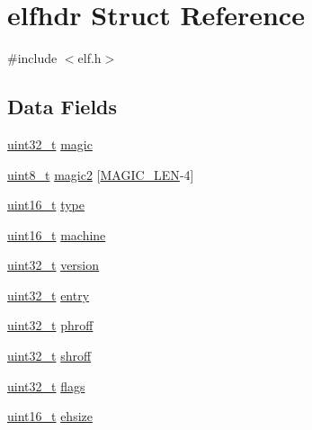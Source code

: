 \hypertarget{structelfhdr}{\section{elfhdr \-Struct \-Reference}
\label{structelfhdr}
}


{\ttfamily \#include $<$elf.\-h$>$}

\subsection*{\-Data \-Fields}
\begin{DoxyCompactItemize}
\item 
\hyperlink{types_8h_a435d1572bf3f880d55459d9805097f62}{uint32\-\_\-t} \hyperlink{structelfhdr_a2d862509e1dfe4ba14543e95fa05edb6}{magic}
\item 
\hyperlink{types_8h_aba7bc1797add20fe3efdf37ced1182c5}{uint8\-\_\-t} \hyperlink{structelfhdr_a4f962ab58af76d17f532434179917452}{magic2} \mbox{[}\hyperlink{elf_8h_aa7e622d9c8c0613148666be53bd18159}{\-M\-A\-G\-I\-C\-\_\-\-L\-E\-N}-\/4\mbox{]}
\item 
\hyperlink{types_8h_a273cf69d639a59973b6019625df33e30}{uint16\-\_\-t} \hyperlink{structelfhdr_adb5bfdc812a00aa5e6ab031f24a91698}{type}
\item 
\hyperlink{types_8h_a273cf69d639a59973b6019625df33e30}{uint16\-\_\-t} \hyperlink{structelfhdr_a417ec10f6d28d86b531b43fb2ec756c2}{machine}
\item 
\hyperlink{types_8h_a435d1572bf3f880d55459d9805097f62}{uint32\-\_\-t} \hyperlink{structelfhdr_adb2ce1c30d98c0be0529bcd30ba26022}{version}
\item 
\hyperlink{types_8h_a435d1572bf3f880d55459d9805097f62}{uint32\-\_\-t} \hyperlink{structelfhdr_a1d87fa5f4b71692c2371527ae88a825b}{entry}
\item 
\hyperlink{types_8h_a435d1572bf3f880d55459d9805097f62}{uint32\-\_\-t} \hyperlink{structelfhdr_aeff5a468f7f1e3c03c54caaf5a5f30d4}{phroff}
\item 
\hyperlink{types_8h_a435d1572bf3f880d55459d9805097f62}{uint32\-\_\-t} \hyperlink{structelfhdr_a92953e553ac2459b8ecd23109d6921f5}{shroff}
\item 
\hyperlink{types_8h_a435d1572bf3f880d55459d9805097f62}{uint32\-\_\-t} \hyperlink{structelfhdr_a011308d8f1d85aa612b828b00b5e1c4c}{flags}
\item 
\hyperlink{types_8h_a273cf69d639a59973b6019625df33e30}{uint16\-\_\-t} \hyperlink{structelfhdr_ad75ebd2222fc338c6ea326e5fb540ad9}{ehsize}
\item 

\end{DoxyCompactItemize}
